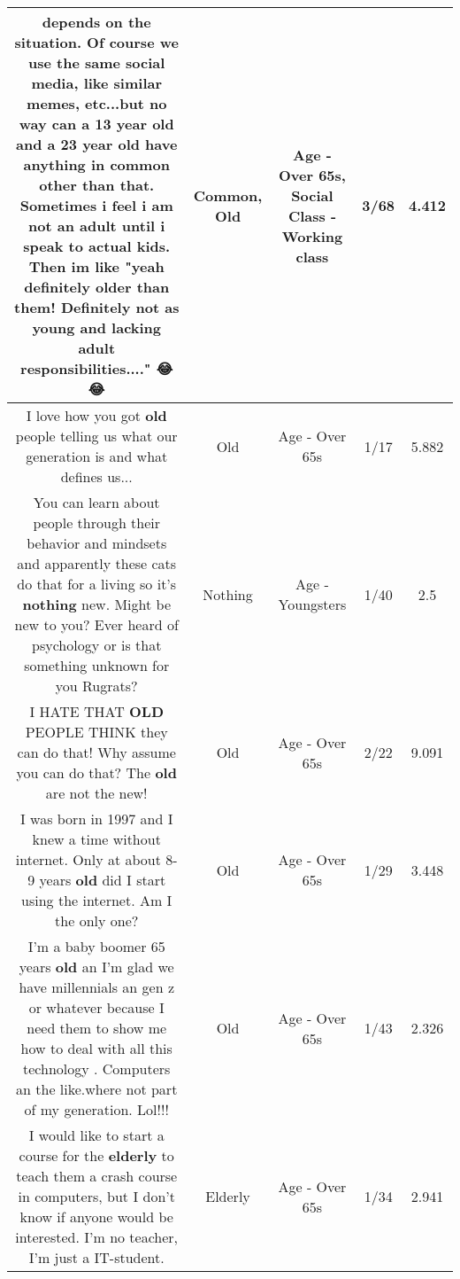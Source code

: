 \documentclass[11pt]{article}
\newlength\mylength
\begin{document}
\begin{center}
\begin{longtable}{|C{.65\mylength}|C{.30\mylength}|C{.12\mylength}|C{.12\mylength}|C{.12\mylength}|}
  \small {} depends on the situation.  Of course we use the same social media, like similar memes, etc...but no way can a 13 year \textbf{old} and a 23 year \textbf{old} have anything in \textbf{common} other than that. Sometimes i feel i am not an adult until i speak to actual kids. Then im like "yeah definitely older than them! Definitely not as young and lacking adult responsibilities...." 😂😂\normalsize   & Common, Old & Age - Over 65s, Social Class - Working class & 3/68 & 4.412 \\  \hline
  \small I love how you got \textbf{old} people telling us what our generation is and what defines us...\normalsize   & Old & Age - Over 65s & 1/17 & 5.882 \\  \hline
  \small You can learn about people through their behavior and mindsets and apparently these cats do that for a living so it's \textbf{nothing} new. Might be new to you? Ever heard of psychology or is that something unknown for you Rugrats?\normalsize   & Nothing & Age - Youngsters & 1/40 & 2.5 \\  \hline
  \small I HATE THAT \textbf{OLD} PEOPLE THINK they can do that! Why assume you can do that? The \textbf{old} are not the new!\normalsize   & Old & Age - Over 65s & 2/22 & 9.091 \\  \hline
  \small I was born in 1997 and I knew a time without internet. Only at about 8-9 years \textbf{old} did I start using the internet. Am I the only one?\normalsize   & Old & Age - Over 65s & 1/29 & 3.448 \\  \hline
  \small I'm a baby boomer 65 years \textbf{old} an I'm glad we have millennials an gen z or whatever because I need them to show me how to deal with all this technology . Computers an the like.where not part of my generation. Lol!!!\normalsize   & Old & Age - Over 65s & 1/43 & 2.326 \\  \hline
  \small I would like to start a course for the \textbf{elderly} to teach them a crash course in computers, but I don't know if anyone would be interested. I'm no teacher, I'm just a IT-student.\normalsize   & Elderly & Age - Over 65s & 1/34 & 2.941 \\  \hline

\end{longtable}
\end{center}
\end{document}
